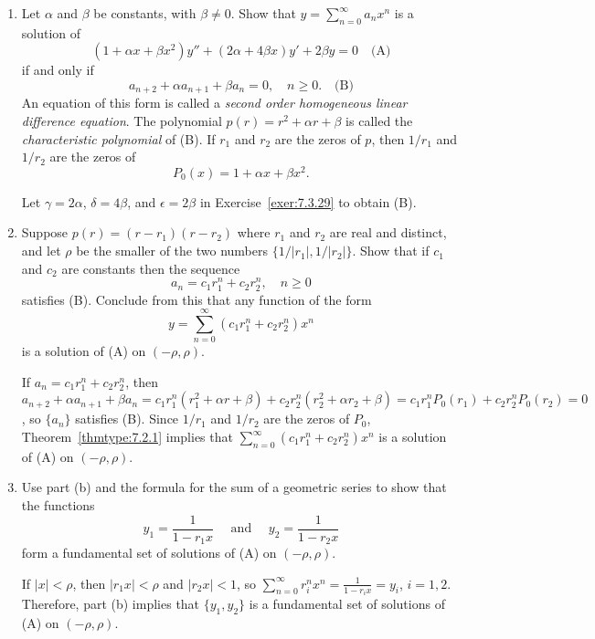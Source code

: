 \documentclass{ximera}
\begin{document}
\begin{problem}\label{exer:7.3.30}
\begin{enumerate}
\item %
Let $\alpha$  and $\beta$  be constants, with $\beta\neq 0$. Show that
$y=\sum_{n=0}^\infty a_nx^n$
is a solution of
$$
(1+\alpha x+\beta x^2)y''+(2\alpha+4\beta x)y'+2\beta y=0\quad
\text{(A)}
$$
if and only if
$$
 a_{n+2}+\alpha a_{n+1}+\beta a_n=0,\quad n\geq 0.\quad
\text{(B)}
$$
An equation of this form is called a {\color{blue}\it second order homogeneous linear
difference equation\/}. The polynomial $p(r)=r^2+\alpha r+\beta$ is called the
{\color{blue}\it characteristic polynomial\/} of (B).
If $r_1$
and $r_2$ are the zeros of $p$, then $1/r_1$ and $1/r_2$ are the
zeros of
$$
P_0(x)=1+\alpha x+\beta x^2.
$$

\begin{solution}
    Let $\gamma=2\alpha$, $\delta=4\beta$, and $\epsilon=2\beta$
in Exercise~\ref{exer:7.3.29} to obtain (B).
\end{solution}

\item %
Suppose  $p(r)=(r-r_1)(r-r_2)$ where $r_1$ and $r_2$ are real
and distinct, and
let $\rho$ be the smaller of the two numbers $\{1/|r_1|,1/|r_2|\}$. Show
that if  $c_1$  and $c_2$ are constants then the sequence
$$
a_n=c_1r_1^n+c_2r_2^n,\quad n\geq 0
$$
satisfies (B). Conclude from this that any function of the form
$$
y=\sum_{n=0}^\infty (c_1r_1^n+c_2r_2^n)x^n
$$
is a solution of (A) on $(-\rho,\rho)$.

\begin{solution}
    If $a_n=c_1r_1^n+c_2r_2^n$, then $a_{n+2}+\alpha
a_{n+1}+\beta a_n=c_1r_1^n(r_1^2+\alpha
r+\beta)+c_2r_2^n(r_2^2+\alpha
r_2+\beta)=c_1r_1^nP_0(r_1)+c_2r_2^nP_0(r_2)=0$, so $\{a_n\}$
satisfies (B). Since $1/r_1$ and $1/r_2$ are the zeros
of $P_0$, Theorem~\ref{thmtype:7.2.1} implies  that $\sum_{n=0}^\infty
(c_1r_1^n+c_2r_2^n)x^n$ is a solution of (A) on $(-\rho,\rho)$.
\end{solution}

\item %
Use part (b)  and the formula for the sum of a geometric series to show
that
the functions
$$
y_1=\frac{1}{1-r_1x}\quad\text{ and }\quad y_2=\frac{1}{1-r_2x}
$$
form a fundamental set of solutions of (A) on $(-\rho,\rho)$.

\begin{solution}
    If $|x|<\rho$, then $|r_1x|<\rho$ and $|r_2x|<1$, so
$\sum_{n=0}^\infty r_i^nx^n=\frac{1}{1-r_ix}=y_i$, $i=1,2$.
Therefore,
part (b) implies that $\{y_1,y_2\}$ is a fundamental set of solutions
of (A) on $(-\rho,\rho)$.
\end{solution}


\end{enumerate}
\end{problem}
\end{document}
